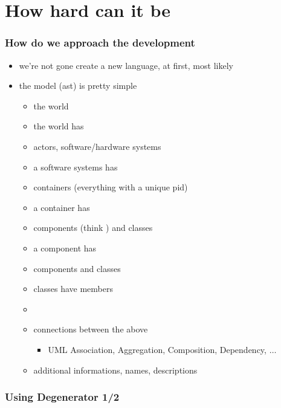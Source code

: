 \documentclass[xelatex,13pt]{beamer}
\begin{document}
\section{How hard can it be}
\begin{frame}
	\frametitle{How do we approach the development}
	\begin{itemize}
		\item we're not gone create a new language\pause, at first\pause,
			most likely
			\pause
		\item the model (ast) is pretty simple
			\pause
		\begin{itemize}
			\item the world
			\item the world has
			\item actors, software/hardware systems
			\item a software systems has
			\item containers (everything with a unique pid)
			\item a container has
			\item components (think \lstinline@module@) and classes
			\item a component has
			\item components and classes
			\item classes have members
			\item[]
			\item connections between the above
			\begin{itemize}
				\item UML Association, Aggregation, Composition, Dependency, \(\dots\)
			\end{itemize}
			\item additional informations, names, descriptions
		\end{itemize}
	\end{itemize}
\end{frame}

\begin{frame}
	\frametitle{Using Degenerator 1/2}
	
	\pause
	
	\pause
	
	\pause
	
\end{frame}
\end{document}

